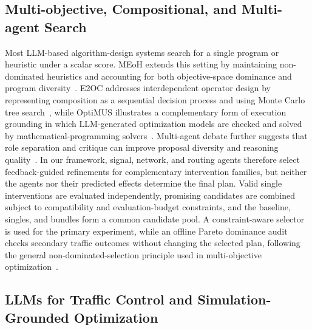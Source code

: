\documentclass{trbunofficial}
\begin{document}
\subsection{Multi-objective, Compositional, and Multi-agent Search}

Most LLM-based algorithm-design systems search for a single program or
heuristic under a scalar score. MEoH extends this setting by maintaining
non-dominated heuristics and accounting for both objective-space dominance and
program diversity~\cite{yao2025meoh}. E2OC addresses interdependent operator
design by representing composition as a sequential decision process and using
Monte Carlo tree search~\cite{qiu2026e2oc}, while OptiMUS illustrates a
complementary form of execution grounding in which LLM-generated optimization
models are checked and solved by mathematical-programming
solvers~\cite{ahmaditeshnizi2024optimus}. Multi-agent debate further suggests that
role separation and critique can improve proposal diversity and reasoning
quality~\cite{du2024debate}. In our framework, signal, network, and routing
agents therefore select feedback-guided refinements for complementary
intervention families, but neither the agents nor their predicted effects
determine the final plan. Valid single interventions are evaluated independently,
promising candidates are combined subject to
compatibility and evaluation-budget constraints, and the baseline, singles,
and bundles form a common candidate pool. A constraint-aware selector is used
for the primary experiment, while an offline Pareto dominance audit checks
secondary traffic outcomes without changing the selected plan, following the
general non-dominated-selection principle used in multi-objective
optimization~\cite{deb2002nsgaii}.

\subsection{LLMs for Traffic Control and Simulation-Grounded Optimization}
\end{document}

